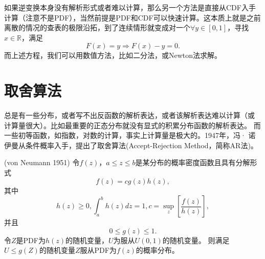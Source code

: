 如果逆变换本身没有解析形式或者难以计算，那么另一个方法是直接从CDF入手
计算（注意不是PDF），当然前提是PDF和CDF可以快速计算。这本质上就是之前
离散的情况的查表的极限沿拓，到了连续情形就变成对一个$\forall y \in [0,
1]$，寻找$x \in \mathbb{R}$，满足
\begin{equation}
  F(x) = y \Rightarrow F(x) - y = 0.
  \label{eq::inv_equation}
\end{equation}
而上述方程，我们可以用数值方法，比如二分法，或Newton法求解。

\section{取舍算法}

总是有一些分布，或者写不出反函数的解析表达，或者该解析表达难以计算（或
  计算量很大）。比如最重要的正态分布就没有显式的积累分布函数的解析表达。
而一些初等函数，如指数，对数的计算，事实上计算量是极大的。1947年，冯·
诺伊曼\cite{von195113}从条件概率入手，提出了取舍算法(Accept-Rejection
Method，简称AR法)。

\begin{theorem} (von Neumann 1951)
令$f(z)$，$a \leq z \leq b$是某分布的概率密度函数且具有分解形式
  \begin{equation}
    f(z) = c g(z) h(z),
    \label{eq::AR_frac_pdf}
  \end{equation}
  其中
  \begin{equation}
    h(z) \geq 0, \int_a^b h(z) dz = 1, c = \sup_{z}\left[\frac{f(z)}{h(z)}\right],
    \label{eq::AR_pfd_hc}
  \end{equation}
  并且
  \begin{equation}
    0 \leq g(z) \leq 1.
    \label{eq::AR_pdf_g}
  \end{equation}
  令$Z$是PDF为$h(z)$的随机变量，$U$为服从$U(0, 1)$的随机变量。
  则满足$U \leq g(Z)$的随机变量$Z$服从PDF为$f(z)$的概率分布。
  \label{thm::AR}
\end{theorem}

